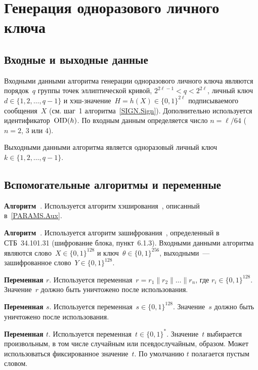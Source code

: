 \section{Генерация одноразового личного ключа}\label{GENK}

\subsection{Входные и выходные данные}

Входными данными алгоритма генерации одноразового 
личного ключа являются порядок~$q$ группы точек эллиптической кривой, 
$2^{2\ell-1}<q<2^{2\ell}$,
личный ключ $d\in\{1,2,\ldots,q-1\}$ 
и хэш-значение~$H=h(X)\in\{0,1\}^{2\ell}$ подписываемого сообщения~$X$
(см. шаг~1 алгоритма~\ref{SIGN.Sign}). 
%
Дополнительно используется идентификатор~$\text{\normalfont OID}(h)$.
%
По входным данным определяется число $n=\ell/64$
($n=2$, $3$ или $4$).
                                                        
Выходными данными алгоритма является одноразовый личный
ключ~$k\in\{1,2,\ldots,{q-1}\}$.

\subsection{Вспомогательные алгоритмы и переменные}

{\bf Алгоритм~}.
Используется алгоритм хэширования~, 
описанный в~\ref{PARAMS.Aux}.

{\bf Алгоритм~}.
Используется алгоритм зашифрования~, 
определенный в СТБ~34.101.31 (шифрование блока, пункт~6.1.3).
Входными данными алгоритма являются слово~$X\in\{0,1\}^{128}$
и ключ~$\theta\in\{0,1\}^{256}$,
выходными~--- зашифрованное слово~$Y\in\{0,1\}^{128}$.

{\bf Переменная $r$}.
Используется переменная~$r=r_1\parallel r_2\parallel\ldots\parallel r_n$,
где $r_i\in\{0,1\}^{128}$.
%
Значение~$r$ должно быть уничтожено после использования.

{\bf Переменная $s$}.
Используется переменная~$s\in\{0,1\}^{128}$.
Значение~$s$ должно быть уничтожено после использования.

{\bf Переменная $t$}.
Используется переменная~$t\in\{0,1\}^*$.
Значение~$t$ выбирается произвольным, в том числе случайным
или псевдослучайным, образом. Может использоваться
фиксированное значение~$t$. По умолчанию $t$ полагается
пустым словом.
                                               
